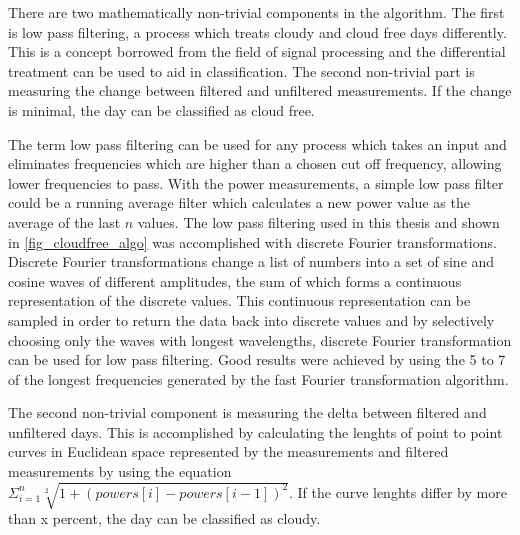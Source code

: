 \noindent There are two mathematically non-trivial components in the algorithm. The first is low pass filtering, a process which treats cloudy and cloud free days differently. This is a concept borrowed from the field of signal processing and the differential treatment can be used to aid in classification. The second non-trivial part is measuring the change between filtered and unfiltered measurements. If the change is minimal, the day can be classified as cloud free.

The term low pass filtering can be used for any process which takes an input and eliminates frequencies which are higher than a chosen cut off frequency, allowing lower frequencies to pass. With the power measurements, a simple low pass filter could be a running average filter which calculates a new power value as the average of the last $n$ values. The low pass filtering used in this thesis and shown in \ref{fig_cloudfree_algo} was accomplished with discrete Fourier transformations. Discrete Fourier transformations change a list of numbers into a set of sine and cosine waves of different amplitudes, the sum of which forms a continuous representation of the discrete values. This continuous representation can be sampled in order to return the data back into discrete values and by selectively choosing only the waves with longest wavelengths, discrete Fourier transformation can be used for low pass filtering. Good results were achieved by using the 5 to 7 of the longest frequencies generated by the fast Fourier transformation algorithm. 



The second non-trivial component is measuring the delta between filtered and unfiltered days. This is accomplished by calculating the lenghts of point to point curves in Euclidean space represented by the measurements and filtered measurements by using the equation $\Sigma_{i=1}^{n}  \sqrt[2]{1+ (powers[i]-powers[i-1])^2}$. If the curve lenghts differ by more than x percent, the day can be classified as cloudy.


